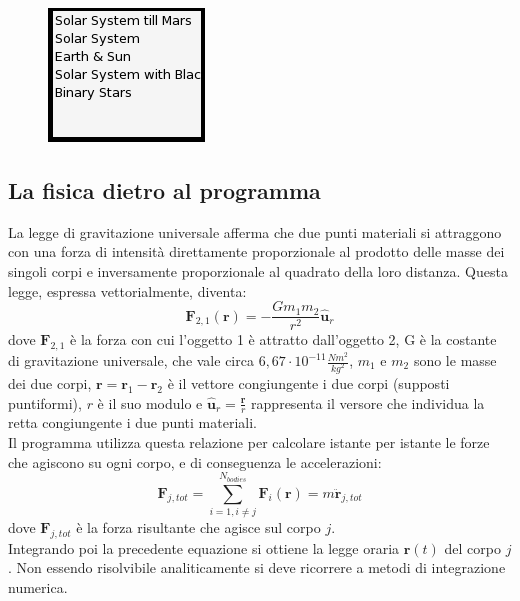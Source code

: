 \documentclass{article}
\begin{document}
\begin{figure} [H]
    \centering
    \includegraphics[height=.20\linewidth]{menu.png}
    \label{menu}
\end{figure}


\subsection{La fisica dietro al programma}
\label{fisica}
La legge di gravitazione universale afferma che due punti materiali si attraggono con una forza di intensità direttamente proporzionale al prodotto delle masse dei singoli corpi e inversamente proporzionale al quadrato della loro distanza. Questa legge, espressa vettorialmente, diventa:
\begin{equation}
    \mathbf{F}_{2,1}(\mathbf{r})=-\frac{Gm_{1}m_{2}}{r^{2}}\mathbf{\hat{u}}_{r}
\end{equation}
dove $\textbf{F}_{2,1}$ è la forza con cui l'oggetto 1 è attratto dall'oggetto 2, G è la costante di gravitazione universale, che vale circa $6,67\cdot 10^{-11}\frac{Nm^2}{kg^2}$, $m_1$ e $m_2$ sono le masse dei due corpi, $\textbf{r}=\textbf{r}_1-\textbf{r}_2$ è il vettore congiungente i due corpi (supposti puntiformi), 
$r$ è il suo modulo e $\hat{\textbf{u}}_{r}=\frac{\textbf{r}}{r}$ rappresenta il versore che individua la retta congiungente i due punti materiali.\\
Il programma utilizza questa relazione per calcolare istante per istante le forze che agiscono su ogni corpo, e di conseguenza le accelerazioni:
\begin{equation}
    \textbf{F}_{j,tot}=\sum_{i=1, i\neq j}^{N_{bodies}}\textbf{F}_{i}(\textbf{r})=m\ddot{\textbf{r}}_{j,tot}
    \label{eq2}
\end{equation}
dove $\textbf{F}_{j,tot}$ è la forza risultante che agisce sul corpo $j$.\\
Integrando poi la precedente equazione si ottiene la legge oraria $\textbf{r}(t)$ del corpo $j$. Non essendo risolvibile analiticamente si deve ricorrere a metodi di integrazione numerica.
\end{document}
